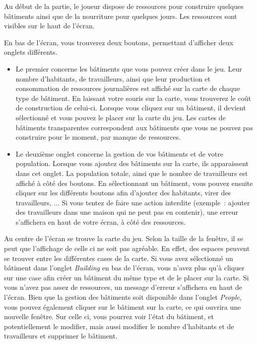 \documentclass{article}
\begin{document}
Au début de la partie, le joueur dispose de ressources pour construire quelques bâtiments ainsi
que de la nourriture pour quelques jours. Les ressources sont visibles sur le haut de l'écran.


En bas de l'écran, vous trouverez deux boutons, permettant d'afficher deux onglets différents.
\begin{itemize}
\item Le premier concerne les bâtiments que vous pouvez créer dans le jeu. Leur nombre d'habitants, de travailleurs,
ainsi que leur production et consommation de ressources journalières est affiché sur la carte de chaque type de bâtiment.
En laissant votre souris sur la carte, vous trouverez le coût de construction de celui-ci.
Lorsque vous cliquez sur un bâtiment, il devient sélectionné et vous pouvez le placer sur la carte du jeu.
Les cartes de bâtiments transparentes correspondent aux bâtiments que vous ne pouvez pas construire pour le moment,
par manque de ressources.
\item Le deuxième onglet concerne la gestion de vos bâtiments et de votre population. Lorsque vous ajoutez
des bâtiments sur la carte, ils apparaissent dans cet onglet. La population totale, ainsi que
le nombre de travailleurs est affiché à côté des boutons. En sélectionnant un bâtiment, vous pouvez ensuite
cliquer sur les différents boutons afin d'ajouter des habitants, virer des travailleurs, ...
Si vous tentez de faire une action interdite (exemple : ajouter des travailleurs dans une maison qui ne peut pas en contenir),
une erreur s'affichera en haut de votre écran, à côté des ressources.
\end{itemize}

Au centre de l'écran se trouve la carte du jeu. Selon la taille de la fenêtre, il se peut
que l'affichage de celle ci ne soit pas agréable. En effet, des espaces peuvent se trouver
entre les différentes cases de la carte.
Si vous avez sélectionné un bâtiment dans l'onglet \textit{Building} en bas de l'écran, vous n'avez plus qu'à cliquer sur une case
afin créer un bâtiment du même type et de le placer sur la carte. Si vous n'avez pas assez de ressources,
un message d'erreur s'affichera en haut de l'écran. Bien que la gestion des bâtiments soit disponible
dans l'onglet \textit{People}, vous pouvez également cliquer sur le bâtiment sur la carte, ce qui ouvrira une 
nouvelle fenêtre. Sur celle ci, vous pourrez voir l'état du bâtiment, et potentiellement le modifier, mais aussi modifier le nombre
d'habitants et de travailleurs et supprimer le bâtiment.
\end{document}
